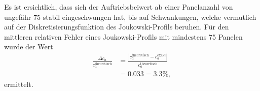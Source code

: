 Es ist ersichtlich, dass sich der Auftriebsbeiwert ab einer Panelanzahl von ungefähr 75 stabil eingeschwungen hat, bis auf Schwankungen, welche vermutlich auf der Diskretisierungsfunktion des Joukowski-Profils beruhen. Für den mittleren relativen Fehler eines Joukowski-Profils mit mindestens 75 Panelen wurde der Wert
\begin{align*}
\frac{\Delta c_a}{c_a^\mathrm{theoretisch}} &= \frac{|c_a^\mathrm{theoretisch} - c_a^\mathrm{exakt}|}{c_a^\mathrm{theoretisch}} \\
& = 0.033 = 3.3 \%,
\end{align*}
ermittelt. \cite{Abello2018} \cite{Barba:2019}
